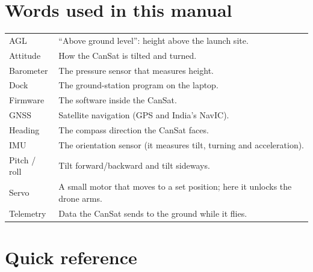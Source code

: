 \documentclass[11pt,a4paper,oneside]{article}
\begin{document}
\section{Words used in this manual}

\begin{tabularx}{\linewidth}{@{}lL@{}}
\toprule
AGL & ``Above ground level'': height above the launch site. \\
Attitude & How the CanSat is tilted and turned. \\
Barometer & The pressure sensor that measures height. \\
Dock & The ground-station program on the laptop. \\
Firmware & The software inside the CanSat. \\
GNSS & Satellite navigation (GPS and India's NavIC). \\
Heading & The compass direction the CanSat faces. \\
IMU & The orientation sensor (it measures tilt, turning and acceleration). \\
Pitch / roll & Tilt forward/backward and tilt sideways. \\
Servo & A small motor that moves to a set position; here it unlocks the drone arms. \\
Telemetry & Data the CanSat sends to the ground while it flies. \\
\bottomrule
\end{tabularx}

\appendix
\section{Quick reference}\label{sec:quickref}
\end{document}
